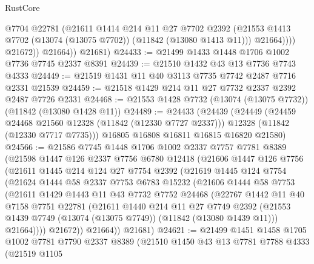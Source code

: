 \begin{lexlean}{RustCore}
\begin{coremodule}
                    @7704
                    @22781
                    (@21611
                      @1414
                      @214
                      @11
                      @27
                      @7702
                      @2392
                      (@21553 @1413 @7702 (@13074 (@13075 @7702)) (@11842 (@13080 @1413 @11)))
                      @21664))))
              @21672))
          @21664))
      @21681)
@24433 := @21499 @1433 @1448 @1706 @1002 @7736 @7745 @2337 @8391
@24439 := @21510 @1432 @43 @13 @7736 @7743 @4333
@24449 := @21519 @1431 @11 @40 @3113 @7735 @7742 @2487 @7716 @2331 @21539
@24459 := @21518 @1429 @214 @11 @27 @7732 @2337 @2392 @2487 @7726 @2331
@24468 := @21553 @1428 @7732 (@13074 (@13075 @7732)) (@11842 (@13080 @1428 @11))
@24489 := @24433
    (@24439
      (@24449
        (@24459 @24468 @21560 @12328 (@11842 (@12330 @7727 @2337)))
        @12328
        (@11842 (@12330 @7717 @7735)))
      @16805
      @16808
      @16811
      @16815
      @16820
      @21580)
@24566 := @21586
    @7745
    @1448
    @1706
    @1002
    @2337
    @7757
    @7781
    @8389
    (@21598
      @1447
      @126
      @2337
      @7756
      @6780
      @12418
      (@21606
        @1447
        @126
        @7756
        (@21611
          @1445
          @214
          @124
          @27
          @7754
          @2392
          (@21619
            @1445
            @124
            @7754
            (@21624
              @1444
              @58
              @2337
              @7753
              @6783
              @15232
              (@21606
                @1444
                @58
                @7753
                (@21611
                  @1429
                  @1443
                  @11
                  @43
                  @7732
                  @7752
                  @24468
                  (@22767
                    @1442
                    @11
                    @40
                    @7158
                    @7751
                    @22781
                    (@21611
                      @1440
                      @214
                      @11
                      @27
                      @7749
                      @2392
                      (@21553 @1439 @7749 (@13074 (@13075 @7749)) (@11842 (@13080 @1439 @11)))
                      @21664))))
              @21672))
          @21664))
      @21681)
@24621 := @21499
    @1451
    @1458
    @1705
    @1002
    @7781
    @7790
    @2337
    @8389
    (@21510
      @1450
      @43
      @13
      @7781
      @7788
      @4333
      (@21519
        @1105

\end{coremodule}
\end{lexlean}
